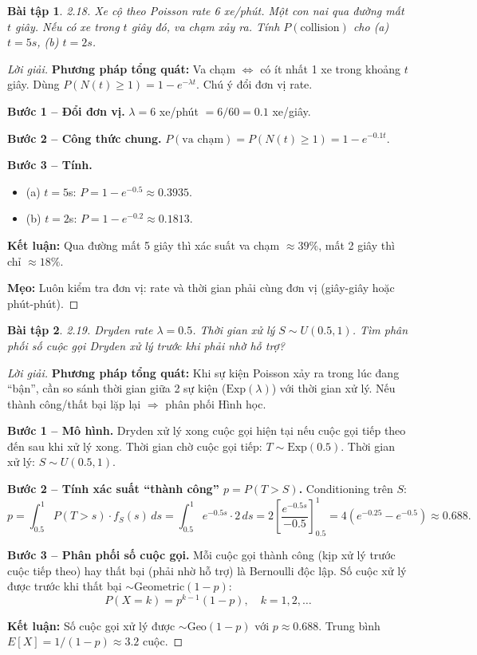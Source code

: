 \documentclass[8pt,a4paper]{article}
\newtheorem{exercise}{Bài tập}
\newenvironment{solution}{\begin{proof}[Lời giải]}{\end{proof}}
\begin{document}
\begin{exercise}
2.18. Xe cộ theo Poisson rate 6 xe/phút. Một con nai qua đường mất $t$ giây. Nếu có xe trong $t$ giây đó, va chạm xảy ra. Tính $P(\text{collision})$ cho (a) $t=5s$, (b) $t=2s$.
\end{exercise}
\begin{solution}
\textbf{Phương pháp tổng quát:} Va chạm $\Leftrightarrow$ có ít nhất 1 xe trong khoảng $t$ giây. Dùng $P(N(t) \geq 1) = 1 - e^{-\lambda t}$. Chú ý đổi đơn vị rate.

\textbf{Bước 1 -- Đổi đơn vị.} $\lambda = 6$ xe/phút $= 6/60 = 0.1$ xe/giây.

\textbf{Bước 2 -- Công thức chung.} $P(\text{va chạm}) = P(N(t) \geq 1) = 1 - e^{-0.1t}$.

\textbf{Bước 3 -- Tính.}
\begin{itemize}[nosep]
  \item (a) $t = 5$s: $P = 1 - e^{-0.5} \approx \boxed{0.3935}$.
  \item (b) $t = 2$s: $P = 1 - e^{-0.2} \approx \boxed{0.1813}$.
\end{itemize}

\textbf{Kết luận:} Qua đường mất 5 giây thì xác suất va chạm $\approx 39\%$, mất 2 giây thì chỉ $\approx 18\%$.

\textbf{Mẹo:} Luôn kiểm tra đơn vị: rate và thời gian phải cùng đơn vị (giây-giây hoặc phút-phút).
\end{solution}

\begin{exercise}
2.19. Dryden rate $\lambda=0.5$. Thời gian xử lý $S \sim U(0.5, 1)$. Tìm phân phối số cuộc gọi Dryden xử lý trước khi phải nhờ hỗ trợ?
\end{exercise}
\begin{solution}
\textbf{Phương pháp tổng quát:} Khi sự kiện Poisson xảy ra trong lúc đang ``bận'', cần so sánh thời gian giữa 2 sự kiện ($\text{Exp}(\lambda)$) với thời gian xử lý. Nếu thành công/thất bại lặp lại $\Rightarrow$ phân phối Hình học.

\textbf{Bước 1 -- Mô hình.} Dryden xử lý xong cuộc gọi hiện tại nếu cuộc gọi tiếp theo đến sau khi xử lý xong. Thời gian chờ cuộc gọi tiếp: $T \sim \text{Exp}(0.5)$. Thời gian xử lý: $S \sim U(0.5, 1)$.

\textbf{Bước 2 -- Tính xác suất ``thành công'' $p = P(T > S)$.} Conditioning trên $S$:
\[
  p = \int_{0.5}^{1} P(T > s) \cdot f_S(s) \, ds = \int_{0.5}^{1} e^{-0.5s} \cdot 2 \, ds = 2 \left[\frac{e^{-0.5s}}{-0.5}\right]_{0.5}^{1} = 4(e^{-0.25} - e^{-0.5}) \approx \boxed{0.688}.
\]

\textbf{Bước 3 -- Phân phối số cuộc gọi.} Mỗi cuộc gọi thành công (kịp xử lý trước cuộc tiếp theo) hay thất bại (phải nhờ hỗ trợ) là Bernoulli độc lập. Số cuộc xử lý được trước khi thất bại $\sim \text{Geometric}(1-p)$:
\[
  \boxed{P(X = k) = p^{k-1}(1-p), \quad k = 1, 2, \ldots}
\]

\textbf{Kết luận:} Số cuộc gọi xử lý được $\sim \text{Geo}(1-p)$ với $p \approx 0.688$. Trung bình $E[X] = 1/(1-p) \approx 3.2$ cuộc.
\end{solution}
\end{document}
